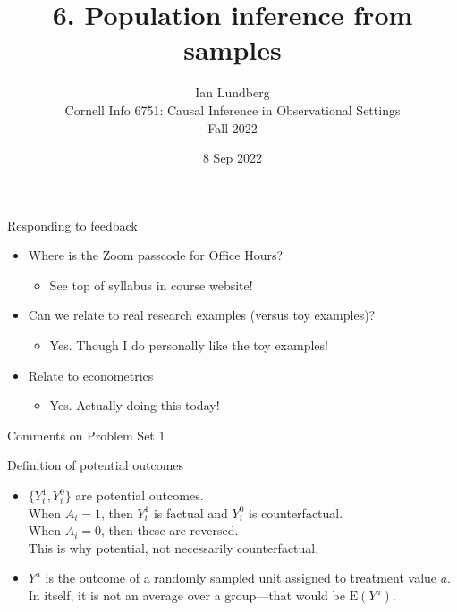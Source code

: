 \documentclass{beamer}
\title{6. Population inference from samples}
\author{Ian Lundberg\\Cornell Info 6751: Causal Inference in Observational Settings\\Fall 2022}
\date{8 Sep 2022}
\newcommand\E{\text{E}}
\begin{document}
\maketitle

\begin{frame}{Responding to feedback}

\begin{itemize}
\item Where is the Zoom passcode for Office Hours? 
\begin{itemize}
\item See top of syllabus in course website!
\end{itemize}
\item Can we relate to real research examples (versus toy examples)?
\begin{itemize}
\item Yes. Though I do personally like the toy examples!
\end{itemize}
\item Relate to econometrics
\begin{itemize}
\item Yes. Actually doing this today!
\end{itemize}
\end{itemize}

\end{frame}

\begin{frame}{Comments on Problem Set 1}

Definition of potential outcomes
\begin{itemize}
\item $\{Y_i^1,Y_i^0\}$ are potential outcomes.\\When $A_i = 1$, then $Y_i^1$ is factual and $Y_i^0$ is counterfactual.\\When $A_i = 0$, then these are reversed.\\This is why potential, not necessarily counterfactual.
\item $Y^a$ is the outcome of a randomly sampled unit assigned to treatment value $a$. In itself, it is not an average over a group---that would be $\E(Y^a)$.
\end{itemize}

\end{frame}
\end{document}

